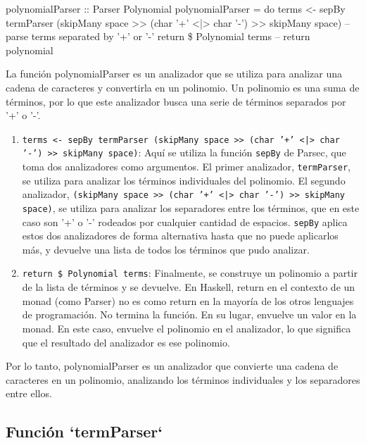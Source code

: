 \documentclass{article}
\begin{document}
\begin{haskell}
  polynomialParser :: Parser Polynomial 
  polynomialParser = do
  terms <- sepBy termParser (skipMany space >> (char '+' <|> char '-') >> skipMany space) -- parse terms separated by '+' or '-'
  return \$ Polynomial terms -- return polynomial
\end{haskell}

La función polynomialParser es un analizador que se utiliza para analizar una cadena de caracteres y convertirla en un polinomio. Un polinomio es una suma de términos, por lo que este analizador busca una serie de términos separados por '+' o '-'.

\begin{enumerate}
  \item \texttt{terms <- sepBy termParser (skipMany space >> (char '+' <|> char '-') >> skipMany space)}: Aquí se utiliza la función \texttt{sepBy} de Parsec, que toma dos analizadores como argumentos. El primer analizador, \texttt{termParser}, se utiliza para analizar los términos individuales del polinomio. El segundo analizador, \texttt{(skipMany space >> (char '+' <|> char '-') >> skipMany space)}, se utiliza para analizar los separadores entre los términos, que en este caso son '+' o '-' rodeados por cualquier cantidad de espacios. \texttt{sepBy} aplica estos dos analizadores de forma alternativa hasta que no puede aplicarlos más, y devuelve una lista de todos los términos que pudo analizar.
  \item \texttt{return \$ Polynomial terms}: Finalmente, se construye un polinomio a partir de la lista de términos y se devuelve. En Haskell, return en el contexto de un monad (como Parser) no es como return en la mayoría de los otros lenguajes de programación. No termina la función. En su lugar, envuelve un valor en la monad. En este caso, envuelve el polinomio en el analizador, lo que significa que el resultado del analizador es ese polinomio.
\end{enumerate}

Por lo tanto, polynomialParser es un analizador que convierte una cadena de caracteres en un polinomio, analizando los términos individuales y los separadores entre ellos.

\subsection{Función `termParser`}
\end{document}
